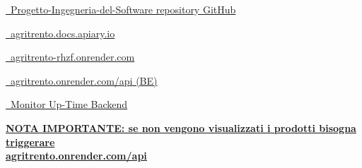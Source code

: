 \documentclass{scrartcl}
\title{\fulltitle}
\date{}
\author{
    \href{https://www.linkedin.com/in/cristianoberardo/}{Cristiano Berardo} - 234428 - \href{https://github.com/CristianoBerardo}{\footnotesize \faGithub \ GitHub}\\
    \href{https://www.linkedin.com/in/martina-de-piccoli-957602353/}{Martina De Piccoli} - 235165 - \href{https://github.com/martinadep}{\footnotesize \faGithub \ GitHub}\\
    \href{https://www.linkedin.com/in/giacomo-vettore-62b571233/}{Giacomo Vettore} - 240396 - \href{https://github.com/giacomovettore02}{\footnotesize \faGithub \ GitHub}\\
}
\begin{document}
\maketitle
\thispagestyle{titlepage}

\begin{center}

    \href{https://github.com/CristianoBerardo/Progetto-Ingegneria-del-Software}{ \faGithub \ \Large Progetto-Ingegneria-del-Software repository GitHub}
    
    \vspace{0.25cm}
    \href{https://agritrento.docs.apiary.io/}{\faLink \ \Large agritrento.docs.apiary.io}
    
    \vspace{0.25cm}
    \href{https://agritrento-rhzf.onrender.com}{\faLink \ \Large agritrento-rhzf.onrender.com}

    \vspace{0.25cm}
    \href{https://agritrento.onrender.com/api}{\faLink \ \Large agritrento.onrender.com/api (BE)}
    
    \vspace{0.25cm}
    \href{https://stats.uptimerobot.com/udFxPl75LM/800696152}{\faLink \ \Large Monitor Up-Time Backend}
    

\vspace{0.5cm}
\underline{\textbf{NOTA IMPORTANTE: se non vengono visualizzati i prodotti bisogna triggerare }} \\
\underline{\textbf{\href{https://agritrento.onrender.com/api}{agritrento.onrender.com/api}}}

\end{center}
\vspace{1.1cm}
\end{document}
